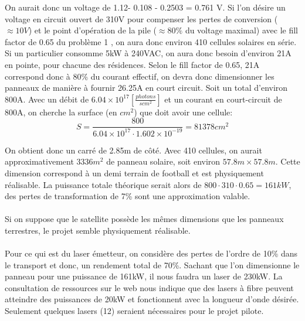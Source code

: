 On aurait donc un voltage de 1.12- 0.108 - 0.2503 = 0.761 V. Si l'on désire un voltage en circuit ouvert de 310V pour compenser les pertes de conversion ($\approx 10V$) et le point d'opération de la pile ($\approx 80\%$ du voltage maximal) avec le fill factor de 0.65 du problème 1 , on aura donc environ 410 cellules solaires en série. Si un particulier consomme 5kW à 240VAC, on aura donc besoin d'environ 21A en pointe, pour chacune des résidences. Selon le fill factor de 0.65, 21A correspond donc à 80\% du courant effectif, on devra donc dimensionner les panneaux de manière à fournir 26.25A en court circuit. Soit un total d'environ 800A. Avec un débit de $6.04\times 10^{17} \left[\frac{photons}{s cm^2}\right]$ et un courant en court-circuit de 800A, on cherche la surface (en $cm^2$) que doit avoir une cellule:
\begin{equation}
S = \frac{800}{6.04\times 10^{17} \cdot 1.602 \times 10^{-19}} = 81 378 cm^2
\end{equation}

On obtient donc un carré de 2.85m de côté. Avec 410 cellules, on aurait approximativement 3336$m^2$ de panneau solaire, soit environ $57.8m \times 57.8m$. Cette dimension correspond à un demi terrain de football et est physiquement réalisable. La puissance totale théorique serait alors de $800\cdot 310\cdot0.65 = 161kW$, des pertes de transformation de 7\% sont une approximation valable.

\paragraph{}Si on suppose que le satellite possède les mêmes dimensions que les panneaux terrestres, le projet semble physiquement réalisable. 
\paragraph{}Pour ce qui est du laser émetteur, on considère des pertes de l'ordre de 10\% dans le transport et donc, un rendement total de 70\%. Sachant que l'on dimensionne le panneau pour une puissance de 161kW, il nous faudra un laser de 230kW. La consultation de ressources sur le web nous indique que des lasers à fibre peuvent atteindre des puissances de 20kW et fonctionnent avec la longueur d'onde désirée. Seulement quelques lasers (12) seraient nécessaires pour le projet pilote. 